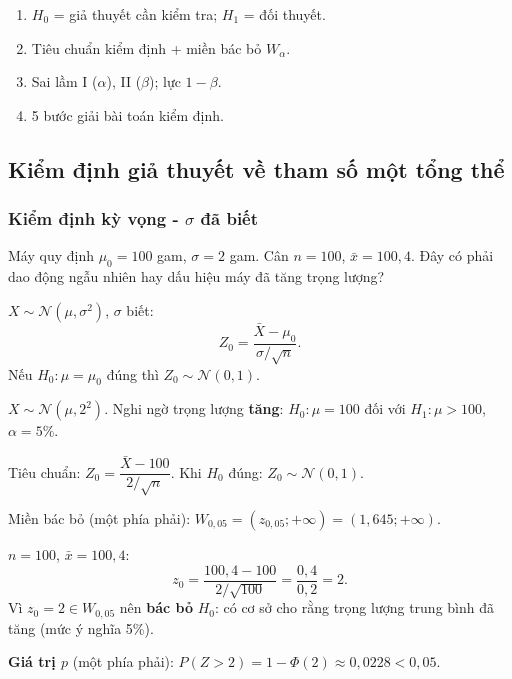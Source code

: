 \documentclass[12pt,a4paper]{article}
\begin{document}
\begin{tongket}[title={Tổng kết}]
\begin{enumerate}
  \item $H_0$ = giả thuyết cần kiểm tra; $H_1$ = đối thuyết.
  \item Tiêu chuẩn kiểm định + miền bác bỏ $W_\alpha$.
  \item Sai lầm I ($\alpha$), II ($\beta$); lực $1-\beta$.
  \item 5 bước giải bài toán kiểm định.
\end{enumerate}
\end{tongket}
\subsection{Kiểm định giả thuyết về tham số một tổng thể}

\subsubsection{Kiểm định kỳ vọng - $\sigma$ đã biết}

\begin{dongco}[title={Động cơ - Máy sản xuất có lệch không?}]
Máy quy định $\mu_0 = 100$ gam, $\sigma = 2$ gam. Cân $n=100$, $\bar{x} = 100{,}4$. Đây có phải dao động ngẫu nhiên hay dấu hiệu máy đã tăng trọng lượng?
\end{dongco}

\begin{congthuc}[title={Kiểm định $\mu$ khi $\sigma$ biết}]
  $X \sim \mathcal{N}(\mu,\sigma^2)$, $\sigma$ biết:
  \[
    Z_0 = \dfrac{\bar{X} - \mu_0}{\sigma/\sqrt{n}}.
  \]
  Nếu $H_0: \mu = \mu_0$ đúng thì $Z_0 \sim \mathcal{N}(0,1)$.
\end{congthuc}

\begin{vidu}[title={Kiểm định trọng lượng máy - kiểm định $z$}]
$X \sim \mathcal{N}(\mu, 2^2)$. Nghi ngờ trọng lượng \textbf{tăng}: $H_0: \mu = 100$ đối với $H_1: \mu > 100$, $\alpha = 5\%$.

\medskip
Tiêu chuẩn: $Z_0 = \dfrac{\bar{X} - 100}{2/\sqrt{n}}$. Khi $H_0$ đúng: $Z_0 \sim \mathcal{N}(0,1)$.

Miền bác bỏ (một phía phải): $W_{0{,}05} = (z_{0{,}05}; +\infty) = (1{,}645; +\infty)$.

\medskip
$n=100$, $\bar{x} = 100{,}4$:
\[
  z_0 = \dfrac{100{,}4 - 100}{2/\sqrt{100}} = \dfrac{0{,}4}{0{,}2} = 2.
\]
Vì $z_0 = 2 \in W_{0{,}05}$ nên \textbf{bác bỏ} $H_0$: có cơ sở cho rằng trọng lượng trung bình đã tăng (mức ý nghĩa 5\%).

\medskip
\textbf{Giá trị $p$} (một phía phải): $P(Z > 2) = 1 - \Phi(2) \approx 0{,}0228 < 0{,}05$.
\end{vidu}
\end{document}
